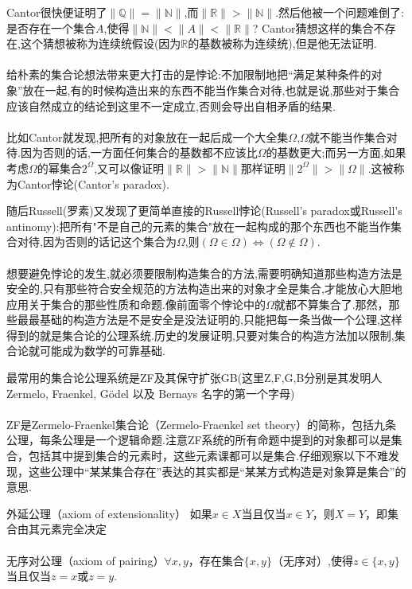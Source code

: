 Cantor很快便证明了$\|\mathbb{Q}\| = \|\mathbb{N}\|$,而$\|\mathbb{R}\| > \|\mathbb{N}\|$.然后他被一个问题难倒了:是否存在一个集合$A$,使得$\|\mathbb{N}\|<\|A\|<\|\mathbb{R}\|$? Cantor猜想这样的集合不存在,这个猜想被称为连续统假设(因为$\mathbb{R}$的基数被称为连续统),但是他无法证明.
\\ \hspace*{\fill} \\%
给朴素的集合论想法带来更大打击的是悖论:不加限制地把“满足某种条件的对象”放在一起,有的时候构造出来的东西不能当作集合对待,也就是说,那些对于集合应该自然成立的结论到这里不一定成立,否则会导出自相矛盾的结果.
\\ \hspace*{\fill} \\%
比如Cantor就发现,把所有的对象放在一起后成一个大全集$\Omega$,$\Omega$就不能当作集合对待.因为否则的话,一方面任何集合的基数都不应该比$\Omega$的基数更大;而另一方面,如果考虑$\Omega$的幂集合$2^\Omega$,又可以像证明$\|\mathbb{R}\| > \|\mathbb{N}\|$那样证明$\|2^\Omega\|>\|\Omega\|$.这被称为Cantor悖论(Cantor's paradox).

随后Russell(罗素)又发现了更简单直接的Russell悖论(Russell's paradox或Russell's antinomy):把所有"不是自己的元素的集合"放在一起构成的那个东西也不能当作集合对待,因为否则的话记这个集合为$\Omega$,则$(\Omega\in \Omega)\Longleftrightarrow (\Omega\notin \Omega)$.
\\ \hspace*{\fill} \\%
想要避免悖论的发生,就必须要限制构造集合的方法,需要明确知道那些构造方法是安全的,只有那些符合安全规范的方法构造出来的对象才全是集合,才能放心大胆地应用关于集合的那些性质和命题.像前面零个悖论中的$\Omega$就都不算集合了.那然，那些最最基础的构造方法是不是安全是没法证明的,只能把每一条当做一个公理,这样得到的就是集合论的公理系统.历史的发展证明,只要对集合的构造方法加以限制,集合论就可能成为数学的可靠基础.

最常用的集合论公理系统是ZF及其保守扩张GB(这里Z,F,G,B分别是其发明人Zermelo, Fraenkel, Gödel 以及 Bernays 名字的第一个字母)
\\ \hspace*{\fill} \\%
ZF是Zermelo-Fraenkel集合论（Zermelo-Fraenkel set theory）的简称，包括九条公理，每条公理是一个逻辑命题.注意ZF系统的所有命题中提到的对象都可以是集合，包括其中提到集合的元素时，这些元素课都可以是集合.仔细观察以下不难发现，这些公理中“某某集合存在”表达的其实都是“某某方式构造是对象算是集合”的意思.

外延公理（axiom of extensionality） 如果$x\in X$当且仅当$x\in Y$，则$X=Y$，即集合由其元素完全决定
\\ \hspace*{\fill} \\%
无序对公理（axiom of pairing）$\forall x,y$，存在集合$\{x,y\}$（无序对）,使得$z\in \{x,y\}$当且仅当$z=x$或$z=y$.

